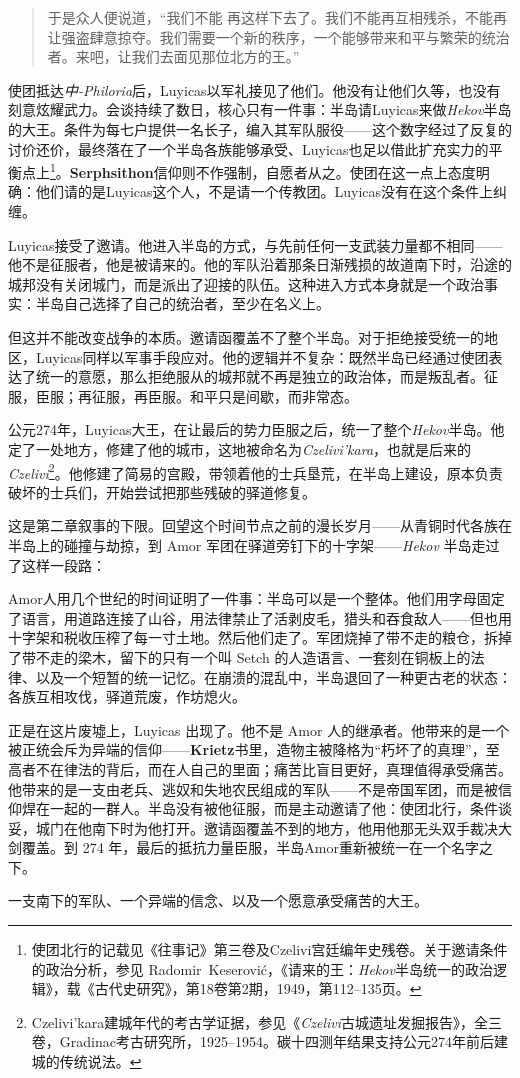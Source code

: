 {\small\kaishu
\begin{quote}
    于是众人便说道，``我们不能
再这样下去了。我们不能再互相残杀，不能再让强盗肆意掠夺。我们需要一个新的秩序，一个能够带来和平与繁荣的统治者。来吧，让我们去面见那位北方的王。'' 
\end{quote}}    

使团抵达\textit{中-Philoria}后，Luyicas以军礼接见了他们。他没有让他们久等，也没有刻意炫耀武力。会谈持续了数日，核心只有一件事：半岛请Luyicas来做\textit{Hekov}半岛的大王。条件为每七户提供一名长子，编入其军队服役——这个数字经过了反复的讨价还价，最终落在了一个半岛各族能够承受、Luyicas也足以借此扩充实力的平衡点上\footnote{使团北行的记载见《往事记》第三卷及Czelivi宫廷编年史残卷。关于邀请条件的政治分析，参见 Radomir~Keserović，《请来的王：\textit{Hekov}半岛统一的政治逻辑》，载《古代史研究》，第18卷第2期，1949，第112--135页。}。\textbf{Serphsithon}信仰则不作强制，自愿者从之。使团在这一点上态度明确：他们请的是Luyicas这个人，不是请一个传教团。Luyicas没有在这个条件上纠缠。

Luyicas接受了邀请。他进入半岛的方式，与先前任何一支武装力量都不相同——他不是征服者，他是被请来的。他的军队沿着那条日渐残损的故道南下时，沿途的城邦没有关闭城门，而是派出了迎接的队伍。这种进入方式本身就是一个政治事实：半岛自己选择了自己的统治者，至少在名义上。

但这并不能改变战争的本质。邀请函覆盖不了整个半岛。对于拒绝接受统一的地区，Luyicas同样以军事手段应对。他的逻辑并不复杂：既然半岛已经通过使团表达了统一的意愿，那么拒绝服从的城邦就不再是独立的政治体，而是叛乱者。征服，臣服；再征服，再臣服。和平只是间歇，而非常态。

公元274年，Luyicas大王，在让最后的势力臣服之后，统一了整个\textit{Hekov}半岛。他定了一处地方，修建了他的城市，这地被命名为\textit{Czelivi'kara}，也就是后来的\textit{Czelivi}\footnote{Czelivi'kara建城年代的考古学证据，参见《\textit{Czelivi}古城遗址发掘报告》，全三卷，Gradinac考古研究所，1925--1954。碳十四测年结果支持公元274年前后建城的传统说法。}。他修建了简易的宫殿，带领着他的士兵垦荒，在半岛上建设，原本负责破坏的士兵们，开始尝试把那些残破的驿道修复。

这是第二章叙事的下限。回望这个时间节点之前的漫长岁月——从青铜时代各族在半岛上的碰撞与劫掠，到 Amor 军团在驿道旁钉下的十字架——\textit{Hekov} 半岛走过了这样一段路：

Amor人用几个世纪的时间证明了一件事：半岛可以是一个整体。他们用字母固定了语言，用道路连接了山谷，用法律禁止了活剥皮毛，猎头和吞食敌人——但也用十字架和税收压榨了每一寸土地。然后他们走了。军团烧掉了带不走的粮仓，拆掉了带不走的梁木，留下的只有一个叫 Setch 的人造语言、一套刻在铜板上的法律、以及一个短暂的统一记忆。在崩溃的混乱中，半岛退回了一种更古老的状态：各族互相攻伐，驿道荒废，作坊熄火。

正是在这片废墟上，Luyicas 出现了。他不是 Amor 人的继承者。他带来的是一个被正统会斥为异端的信仰——\textbf{Krietz}书里，造物主被降格为``朽坏了的真理''，至高者不在律法的背后，而在人自己的里面；痛苦比盲目更好，真理值得承受痛苦。他带来的是一支由老兵、逃奴和失地农民组成的军队——不是帝国军团，而是被信仰焊在一起的一群人。半岛没有被他征服，而是主动邀请了他：使团北行，条件谈妥，城门在他南下时为他打开。邀请函覆盖不到的地方，他用他那无头双手裁决大剑覆盖。到 274 年，最后的抵抗力量臣服，半岛Amor重新被统一在一个名字之下。

一支南下的军队、一个异端的信念、以及一个愿意承受痛苦的大王。
